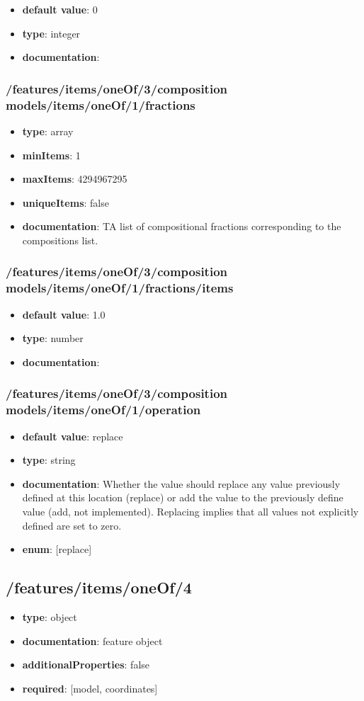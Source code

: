 \begin{itemize}\item {\bf default value}: 0
\item {\bf type}: integer
\item {\bf documentation}: 
\end{itemize}\subsubsection{/features/items/oneOf/3/composition models/items/oneOf/1/fractions}
\begin{itemize}\item {\bf type}: array
\item {\bf minItems}: 1
\item {\bf maxItems}: 4294967295
\item {\bf uniqueItems}: false
\item {\bf documentation}: TA list of compositional fractions corresponding to the compositions list.
\end{itemize}\subsubsection{/features/items/oneOf/3/composition models/items/oneOf/1/fractions/items}
\begin{itemize}\item {\bf default value}: 1.0
\item {\bf type}: number
\item {\bf documentation}: 
\end{itemize}\subsubsection{/features/items/oneOf/3/composition models/items/oneOf/1/operation}
\begin{itemize}\item {\bf default value}: replace
\item {\bf type}: string
\item {\bf documentation}: Whether the value should replace any value previously defined at this location (replace) or add the value to the previously define value (add, not implemented). Replacing implies that all values not explicitly defined are set to zero.
\item {\bf enum}: [replace]\end{itemize}\subsection{/features/items/oneOf/4}
\begin{itemize}\item {\bf type}: object
\item {\bf documentation}: feature object
\item {\bf additionalProperties}: false
\item {\bf required}: [model, coordinates]\end{itemize}
